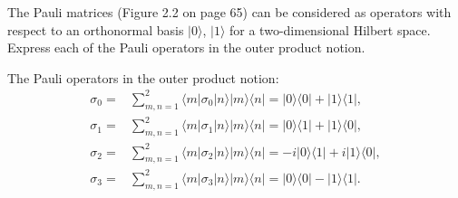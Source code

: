\documentclass[en]{sol-man}
\begin{document}
\begin{exe}
    The Pauli matrices (Figure 2.2 on page 65) can be considered as operators with respect to an orthonormal basis $\lvert 0\rangle$, $\lvert 1\rangle$ for a two-dimensional Hilbert space. Express each of the Pauli operators in the outer product notion.
\end{exe}
\begin{sol}
    The Pauli operators in the outer product notion:
    \begin{align}
        \sigma_0=&\sum_{m,n=1}^2\langle m\rvert\sigma_0\lvert n\rangle\lvert m\rangle\langle n\rvert=\lvert 0\rangle\langle 0\rvert+\lvert 1\rangle\langle 1\rvert,\\
        \sigma_1=&\sum_{m,n=1}^2\langle m\rvert\sigma_1\lvert n\rangle\lvert m\rangle\langle n\rvert=\lvert 0\rangle\langle 1\rvert+\lvert 1\rangle\langle 0\rvert,\\
        \sigma_2=&\sum_{m,n=1}^2\langle m\rvert\sigma_2\lvert n\rangle\lvert m\rangle\langle n\rvert=-i\lvert 0\rangle\langle 1\rvert+i\lvert 1\rangle\langle 0\rvert,\\
        \sigma_3=&\sum_{m,n=1}^2\langle m\rvert\sigma_3\lvert n\rangle\lvert m\rangle\langle n\rvert=\lvert 0\rangle\langle 0\rvert-\lvert 1\rangle\langle 1\rvert.
    \end{align}
\end{sol}
\end{document}
